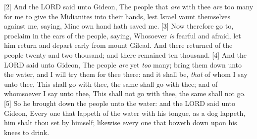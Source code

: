 [2] \textcolor[rgb]{0.00,0.00,1.00}{And the LORD said unto Gideon, The people that \emph{are} with thee \emph{are} too many for me to give the Midianites into their hands, lest Israel vaunt themselves against me, saying, Mine own hand hath saved me.
[3] \textcolor[rgb]{0.00,0.00,1.00}{Now therefore go to, proclaim in the ears of the people, saying, Whosoever \emph{is} fearful and afraid, let him return and depart early from mount Gilead. And there returned of the people twenty and two thousand; and there remained ten thousand.}%
[4] \textcolor[rgb]{0.00,0.00,1.00}{And the LORD said unto Gideon, The people \emph{are} yet \emph{too} many; bring them down unto the water, and I will try them for thee there: and it shall be, \emph{that} of whom I say unto thee, This shall go with thee, the same shall go with thee; and of whomsoever I say unto thee, This shall not go with thee, the same shall not go.}%
[5] \textcolor[rgb]{0.00,0.00,1.00}{So he brought down the people unto the water: and the LORD said unto Gideon, Every one that lappeth of the water with his tongue, as a dog lappeth, him shalt thou set by himself; likewise every one that boweth down upon his knees to drink.}\\
}
